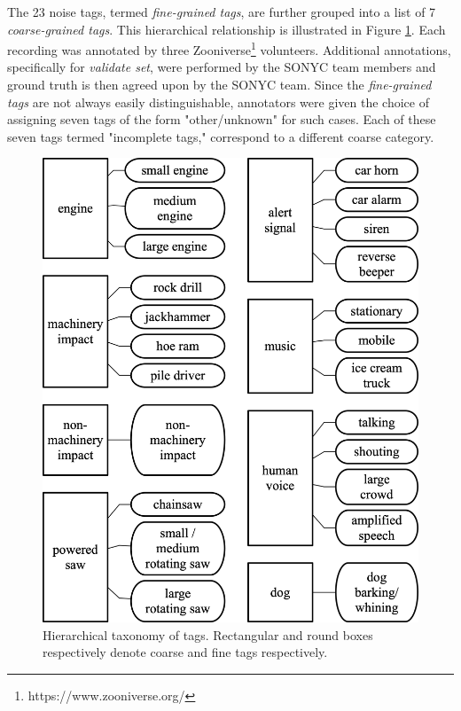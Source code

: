 \documentclass{article}
\begin{document}
\begin{sloppy}
The 23 noise tags, termed \textit{fine-grained tags}, are further grouped into a list of 7 \textit{coarse-grained tags}. This hierarchical relationship is illustrated in Figure \ref{fig:taxonomy}. Each recording was annotated by three Zooniverse\footnote{https://www.zooniverse.org/} volunteers. Additional annotations, specifically for \textit{validate set}, were performed by the SONYC team members and ground truth is then agreed upon by the SONYC team. Since the \textit{fine-grained tags} are not always easily distinguishable, annotators were given the choice of assigning seven tags of the form "other/unknown" for such cases. Each of these seven tags termed "incomplete tags," correspond to a different coarse category.

\begin{figure}[h]
\centering
\includegraphics[scale=0.45]{task5_urban_sound_tagging.png}
\caption{Hierarchical taxonomy of tags. Rectangular and round boxes respectively denote coarse and fine tags respectively. \cite{dcase2019task5}}
\label{fig:taxonomy}
\end{figure}


\end{sloppy}
\end{document}

